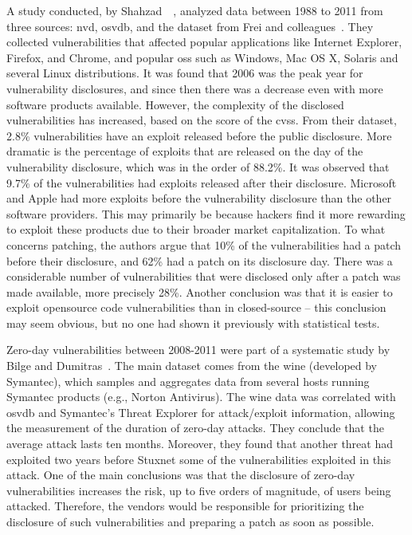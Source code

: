 A study conducted, by Shahzad~\etal{}~\cite{Shahzad:2012}, analyzed data between 1988 to 2011 from three sources: \gls{nvd}, \gls{osvdb}, and the dataset from Frei and colleagues~\cite{Frei:2006}.
They collected vulnerabilities that affected popular applications like Internet Explorer, Firefox, and Chrome, and popular \glspl{os} such as Windows, Mac OS X, Solaris and several Linux distributions. 
It was found that 2006 was the peak year for vulnerability disclosures, and since then there was a decrease even with more software products available. 
However, the complexity of the disclosed vulnerabilities has increased, based on the score of the \gls{cvss}. 
From their dataset, 2.8\% vulnerabilities have an exploit released before the public disclosure. 
More dramatic is the percentage of exploits that are released on the day of the vulnerability disclosure, which was in the order of 88.2\%. 
It was observed that 9.7\% of the vulnerabilities had exploits released after their disclosure.
Microsoft and Apple had more exploits before the vulnerability disclosure than the other software providers. 
This may primarily be because hackers find it more rewarding to exploit these products due to their broader market capitalization.
To what concerns patching, the authors argue that 10\% of the vulnerabilities had a patch before their disclosure, and 62\% had a patch on its disclosure day. 
There was a considerable number of vulnerabilities that were disclosed only after a patch was made available, more precisely 28\%. 
Another conclusion was that it is easier to exploit opensource code vulnerabilities than in closed-source – this conclusion may seem obvious, but no one had shown it previously with statistical tests.

Zero-day vulnerabilities between 2008-2011 were part of a systematic study by Bilge and Dumitras~\cite{Bilge:2012}.
The main dataset comes from the \gls{wine} (developed by Symantec), which samples and aggregates data from several hosts running Symantec products (e.g., Norton Antivirus).
The \gls{wine} data was correlated with \gls{osvdb} and Symantec's Threat Explorer for attack/exploit information, allowing the measurement of the duration of zero-day attacks.
They conclude that the average attack lasts ten months. 
Moreover, they found that another threat had exploited two years before Stuxnet some of the vulnerabilities exploited in this attack.
One of the main conclusions was that the disclosure of zero-day vulnerabilities increases the risk, up to five orders of magnitude, of users being attacked.
Therefore, the vendors would be responsible for prioritizing the disclosure of such vulnerabilities and preparing a patch as soon as possible. 


